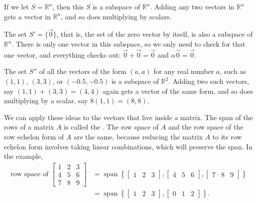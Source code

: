 \begin{example} \label{example:simplesubspaces}
If we let $S = {\mathbb R}^n$, then this $S$ is a subspace of
${\mathbb R}^n$.  Adding any two vectors in ${\mathbb R}^n$ gets a vector in
${\mathbb R}^n$, and so does multiplying by scalars.

The set $S' = \{ \vec{0} \}$, that is,
the set of the zero vector by itself, is 
also a subspace of ${\mathbb R}^n$.  There is only one vector in this
subspace, so we only need to check for that one vector, and everything checks
out: $\vec{0}+\vec{0} = \vec{0}$ and $\alpha \vec{0} = \vec{0}$.

The set $S''$ of all the vectors of the form
$(a,a)$ for any real number $a$, such as $(1,1)$, $(3,3)$, or $(-0.5,-0.5)$
is a subspace of ${\mathbb R}^2$.  Adding two such vectors, say
$(1,1)+(3,3) = (4,4)$ again gets a vector of the same form, and so does
multiplying by a scalar, say $8(1,1) = (8,8)$.
\end{example}

We can apply these ideas to the vectors that live inside a matrix. The span of the rows of a matrix $A$ is called the \emph{}.
The row space of $A$ and the row space of the row echelon form of $A$ are the same, because reducing the matrix $A$ to its row echelon form involves taking linear combinations, which will preserve the span.
In the example,
\begin{equation*}
\begin{split}
\text{row space of }
\begin{bmatrix}
1 & 2 & 3 \\
4 & 5 & 6 \\
7 & 8 & 9
\end{bmatrix}
& =
\operatorname{span}
\left\{
\begin{bmatrix}
1 & 2 & 3
\end{bmatrix}
,
\begin{bmatrix}
4 & 5 & 6
\end{bmatrix}
,
\begin{bmatrix}
7 & 8 & 9
\end{bmatrix}
\right\}
\\
& =
\operatorname{span}
\left\{
\begin{bmatrix}
1 & 2 & 3
\end{bmatrix}
,
\begin{bmatrix}
0 & 1 & 2
\end{bmatrix}
\right\} .
\end{split}
\end{equation*}


